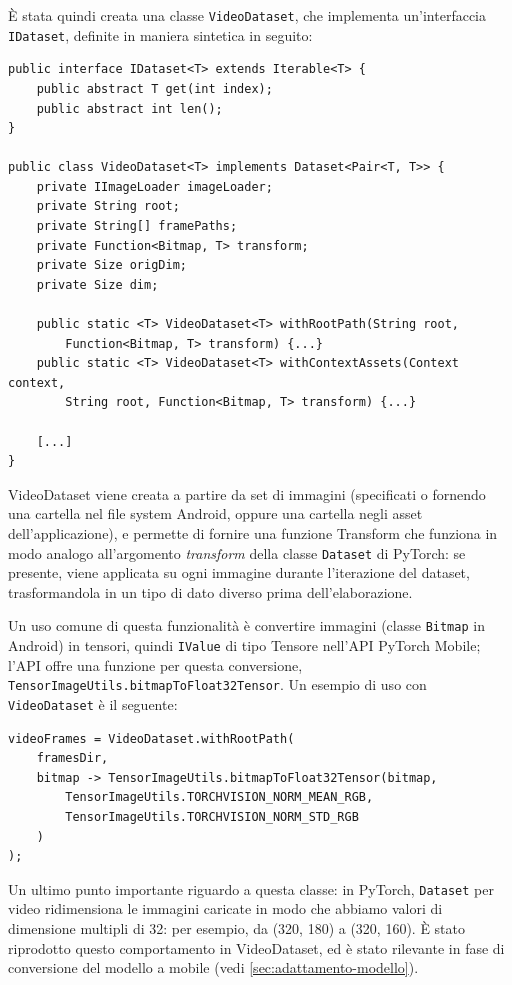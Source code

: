 È stata quindi creata una classe \texttt{VideoDataset}, che implementa un'interfaccia 
\texttt{IDataset}, definite in maniera sintetica in seguito:

\begin{lstlisting}
public interface IDataset<T> extends Iterable<T> {
    public abstract T get(int index);
    public abstract int len();
}

public class VideoDataset<T> implements Dataset<Pair<T, T>> {
    private IImageLoader imageLoader;
    private String root;
    private String[] framePaths;
    private Function<Bitmap, T> transform;
    private Size origDim;
    private Size dim;

    public static <T> VideoDataset<T> withRootPath(String root, 
        Function<Bitmap, T> transform) {...}
    public static <T> VideoDataset<T> withContextAssets(Context context, 
        String root, Function<Bitmap, T> transform) {...}

    [...]
}
\end{lstlisting}

VideoDataset viene creata a partire da set di immagini (specificati o fornendo una cartella
nel file system Android, oppure una cartella negli asset dell'applicazione), e permette di 
fornire una funzione Transform che funziona in modo analogo all'argomento \emph{transform}
della classe \texttt{Dataset} di PyTorch: se presente, viene applicata su ogni immagine
durante l'iterazione del dataset, trasformandola in un tipo di dato diverso prima 
dell'elaborazione. 

Un uso comune di questa funzionalità è convertire immagini (classe
\texttt{Bitmap} in Android) in tensori, quindi \texttt{IValue} di tipo Tensore nell'API
PyTorch Mobile; l'API offre una funzione per questa conversione, 
\texttt{TensorImageUtils.bitmapToFloat32Tensor}. Un esempio di uso con \texttt{VideoDataset} 
è il seguente:

\begin{lstlisting}
videoFrames = VideoDataset.withRootPath(
    framesDir, 
    bitmap -> TensorImageUtils.bitmapToFloat32Tensor(bitmap,
        TensorImageUtils.TORCHVISION_NORM_MEAN_RGB,
        TensorImageUtils.TORCHVISION_NORM_STD_RGB
    )
);
\end{lstlisting}

Un ultimo punto importante riguardo a questa classe: in PyTorch, \texttt{Dataset} per video
ridimensiona le immagini caricate in modo che abbiamo valori di dimensione multipli di 32: per
esempio, da (320, 180) a (320, 160). È stato riprodotto questo comportamento in VideoDataset, ed
è stato rilevante in fase di conversione del modello a mobile (vedi 
\ref{sec:adattamento-modello}).

